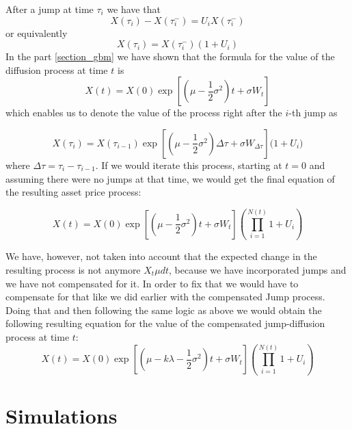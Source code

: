 \documentclass[times, utf8, diplomski]{fer}
\begin{document}
	\noindent After a jump at time $\tau_i$ we have that
	\begin{equation}
		X(\tau_i) - X(\tau_i^-) = U_i X(\tau_i^-)
	\end{equation}
	\noindent or equivalently
	\begin{equation}
		X(\tau_i) = X(\tau_i^-)(1 + U_i)
	\end{equation}
	\noindent In the part \ref{section_gbm} we have shown that the formula for the value of the diffusion process at time $t$ is $$X(t) = X(0)\exp\left[ (\mu-\frac{1}{2}\sigma^2)t + \sigma W_t \right]$$ which enables us to denote the value of the process right after the $i$-th jump as 

	$$X(\tau_i) = X(\tau_{i-1})\exp\left[ (\mu - \frac{1}{2}\sigma^2)\Delta\tau + \sigma W_{\Delta\tau} \right]\bigg(1+U_i\bigg)$$ 
	where $\Delta\tau = \tau_i - \tau_{i-1}$. If we would iterate this process, starting at $t=0$ and assuming there were no jumps at that time, we would get the final equation of the resulting asset price process:

	\begin{equation}\label{eqn_jump_diff}
		X(t) = X(0)\exp\left[ (\mu - \frac{1}{2}\sigma^2)t + \sigma W_{t} \right]\left(\prod_{i=1}^{N(t)}1+U_i\right)
	\end{equation}

	\noindent We have, however, not taken into account that the expected change in the resulting process is not anymore $X_t\mu dt$, because we have incorporated jumps and we have not compensated for it. In order to fix that we would have to compensate for that like we did earlier with the compensated Jump process. Doing that and then following the same logic as above we would obtain the following resulting equation for the value of the compensated jump-diffusion process at time $t$:
	\begin{equation} \label{eqn_jump_diff_compensated}
		X(t) = X(0)\exp\left[ (\mu - k\lambda- \frac{1}{2}\sigma^2)t + \sigma W_{t} \right]\left(\prod_{i=1}^{N(t)}1+U_i\right)
	\end{equation}

	\section{Simulations}
\end{document}
